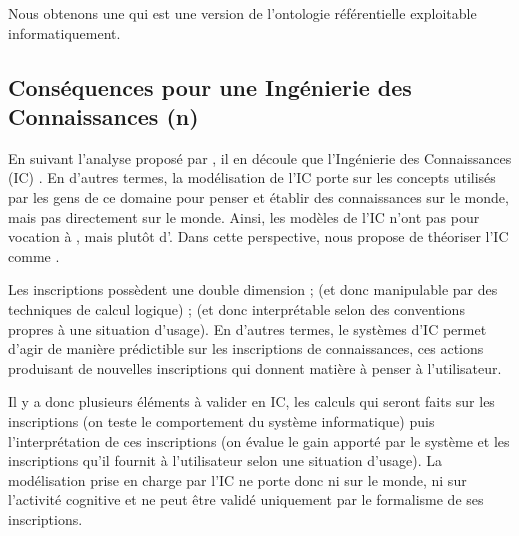 	Nous obtenons une  qui est une version de l'ontologie référentielle exploitable informatiquement.









\subsection{Conséquences pour une Ingénierie des Connaissances (n)}
En suivant l'analyse proposé par \cite{Bachimont2004}, il en découle que  l'Ingénierie des Connaissances (IC) . 
En d'autres termes, la modélisation de l'IC porte sur les concepts utilisés par les gens de ce domaine pour penser et établir des connaissances sur le monde, mais pas directement sur le monde.
Ainsi, les modèles de l'IC n'ont pas pour vocation à , mais plutôt d'. 
Dans cette perspective, \citeauthor{Bachimont2004} nous propose de théoriser l'IC comme . 
        
Les inscriptions possèdent une double dimension ;  (et donc manipulable par des techniques de calcul logique) ;  (et donc interprétable selon des conventions propres à une situation d'usage).  
En d'autres termes, le systèmes d'IC permet d'agir de manière prédictible sur les inscriptions de connaissances, ces actions produisant de nouvelles inscriptions qui donnent matière à penser à l'utilisateur. 
        
Il y a donc plusieurs éléments à valider en IC, les calculs qui seront faits sur les inscriptions (on teste le comportement du système informatique) puis l'interprétation de ces inscriptions (on évalue le gain apporté par le système et les inscriptions qu'il fournit à l'utilisateur selon une situation d'usage). 
La modélisation prise en charge par l'IC ne porte donc ni sur le monde, ni sur l'activité cognitive et ne peut être validé uniquement par le formalisme de ses inscriptions. 
        
